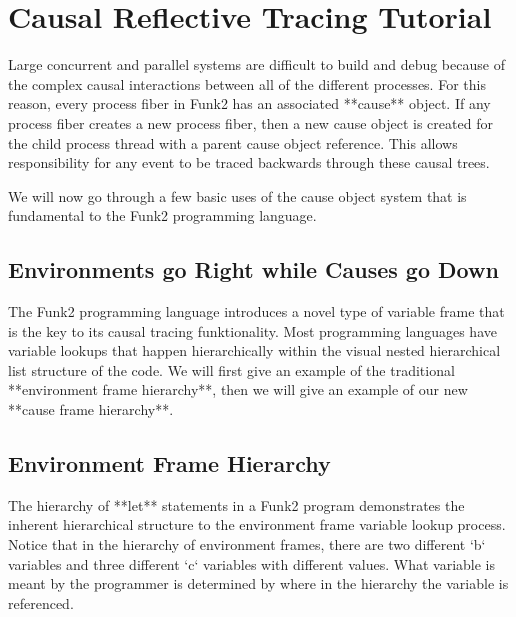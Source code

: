 \chapter{Causal Reflective Tracing Tutorial}\label{appendix:causal_reflective_tracing_tutorial}

Large concurrent and parallel systems are difficult to build and debug
because of the complex causal interactions between all of the
different processes.  For this reason, every process fiber in Funk2
has an associated **cause** object.  If any process fiber creates a
new process fiber, then a new cause object is created for the child
process thread with a parent cause object reference.  This allows
responsibility for any event to be traced backwards through these
causal trees.

We will now go through a few basic uses of the cause object system
that is fundamental to the Funk2 programming language.

\section{Environments go Right while Causes go Down}

The Funk2 programming language introduces a novel type of variable
frame that is the key to its causal tracing funktionality.  Most
programming languages have variable lookups that happen hierarchically
within the visual nested hierarchical list structure of the code.  We
will first give an example of the traditional **environment frame
hierarchy**, then we will give an example of our new **cause frame
hierarchy**.

\section{Environment Frame Hierarchy}

The hierarchy of **let** statements in a Funk2 program demonstrates
the inherent hierarchical structure to the environment frame variable
lookup process.  Notice that in the hierarchy of environment frames,
there are two different `b` variables and three different `c`
variables with different values.  What variable is meant by the
programmer is determined by where in the hierarchy the variable is
referenced.

